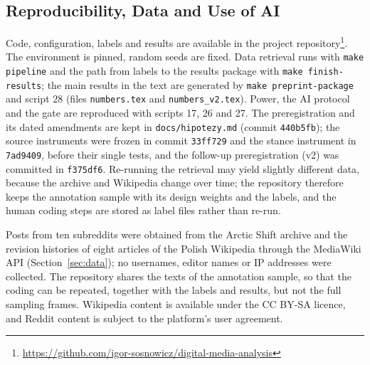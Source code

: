 \documentclass[10pt,a4paper]{article}
\newcommand{\kod}[1]{\texttt{#1}}
\begin{document}
\subsection{Reproducibility, Data and Use of AI}
\label{sec:reproducibility}

Code, configuration, labels and results are available in the project
repository\footnote{\url{https://github.com/igor-sosnowicz/digital-media-analysis}}. The
environment is pinned, random seeds are
fixed. Data retrieval runs with
\kod{make pipeline} and the path from labels to the results package with
\kod{make finish-results}; the main results in the text are generated by
\kod{make preprint-package} and script 28 (files \kod{numbers.tex} and \kod{numbers\_v2.tex}). Power, the
AI protocol and the gate are reproduced with scripts 17, 26 and 27. The preregistration and its dated amendments are kept in
\kod{docs/hipotezy.md} (commit \kod{440b5fb}); the source instruments were frozen in
commit \kod{33ff729} and the stance instrument in \kod{7ad9409}, before their single
tests, and the follow-up preregistration (v2) was committed in \kod{f375df6}. Re-running
the retrieval may yield slightly different data, because the archive and Wikipedia change
over time; the repository therefore keeps the annotation sample with its design weights
and the labels, and the human coding steps are stored as label files rather than re-run.

Posts from ten subreddits were obtained from the Arctic Shift archive and the revision
histories of eight articles of the Polish Wikipedia through the MediaWiki API
(Section~\ref{sec:data}); no usernames, editor names or IP addresses were collected.  The repository
shares the texts of the annotation sample, so that the coding can be repeated, together
with the labels and results, but not the full sampling frames. Wikipedia content is
available under the CC BY-SA licence, and Reddit content is subject to the platform's user
agreement.
\end{document}
